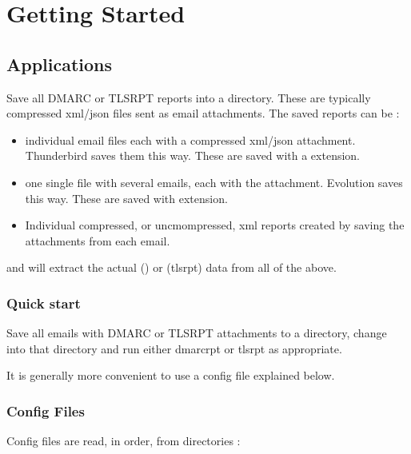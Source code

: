 \documentclass[letterpaper,10pt,english]{sphinxmanual}
\begin{document}
\chapter{Getting Started}
\label{\detokenize{README:getting-started}}

\section{Applications}
\label{\detokenize{README:applications}}
\sphinxAtStartPar
Save all DMARC or TLS\sphinxhyphen{}RPT reports into a directory. These are typically compressed xml/json files
sent as email attachments. The saved reports can be :
\begin{itemize}
\item {} 
\sphinxAtStartPar
individual email files each with a compressed xml/json attachment. Thunderbird saves them this way.
These are saved with a  extension.

\item {} 
\sphinxAtStartPar
one single file with several emails, each with the attachment. Evolution saves this way.
These are saved with  extension.

\item {} 
\sphinxAtStartPar
Individual compressed, or uncmompressed, xml reports created by saving the attachments from each email.

\end{itemize}

\sphinxAtStartPar
{} and  will extract the actual  () or  (tls\sphinxhyphen{}rpt) data
from all of the above.


\subsection{Quick start}
\label{\detokenize{README:quick-start}}
\sphinxAtStartPar
Save all emails with DMARC or TLS\sphinxhyphen{}RPT attachments to a directory, change into that directory and run
either dmarc\sphinxhyphen{}rpt or tls\sphinxhyphen{}rpt as appropriate.

\sphinxAtStartPar
It is generally more convenient to use a config file explained below.


\subsection{Config Files}
\label{\detokenize{README:config-files}}\label{\detokenize{README:config-files-section}}
\sphinxAtStartPar
Config files are read, in order, from directories :
\end{document}
